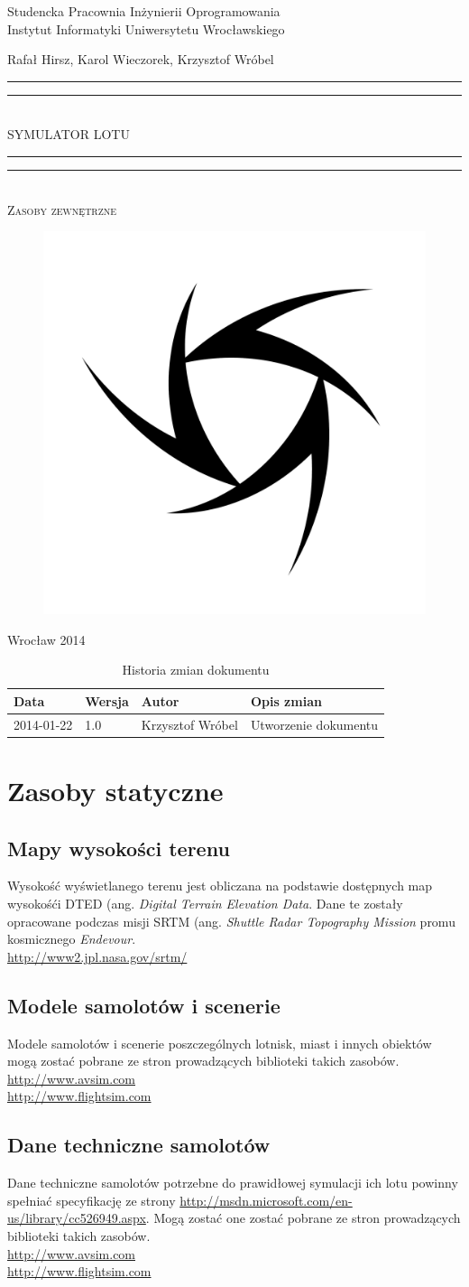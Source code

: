 \documentclass{mwrep}
\newcommand*{\titleGP}{\begingroup
\centering

{\large Studencka Pracownia Inżynierii Oprogramowania}\\Instytut Informatyki Uniwersytetu Wrocławskiego\par
\vspace*{16\baselineskip}

{\Large Rafał Hirsz, Karol Wieczorek, Krzysztof Wróbel\par}
\vspace*{\baselineskip}

\rule{\textwidth}{1.6pt}\vspace*{-\baselineskip}\vspace*{2pt}
\rule{\textwidth}{0.4pt}\\[\baselineskip]

{\Huge SYMULATOR LOTU}\\[0.2\baselineskip]

\rule{\textwidth}{0.4pt}\vspace*{-\baselineskip}\vspace{3.2pt}
\rule{\textwidth}{1.6pt}\\[\baselineskip]

\scshape
{\huge Zasoby zewnętrzne}\par
\vspace*{2\baselineskip}

\begin{figure}[h]
\centering
\includegraphics[width=5\baselineskip]{flightsim-team-logo.pdf}
\end{figure}
\vfill

{\large Wrocław 2014}\par

\pagebreak

\endgroup}
\begin{document}
\thispagestyle{empty}
\titleGP

\begin{center}
\begin{table}[h]
\begin{center}
\caption{Historia zmian dokumentu}\label{T:Zmiany}
\vspace{3ex}
\begin{tabularx}{1\textwidth}{|l|l|l|X|}
\hline
Data & Wersja & Autor & Opis zmian \\ \hline
2014-01-22 & 1.0 & Krzysztof Wróbel & Utworzenie dokumentu \\
\hline
\end{tabularx}
\end{center}
\end{table}
\end{center}

\pagebreak

\tableofcontents

\chapter{Zasoby statyczne}

\section{Mapy wysokości terenu}
Wysokość wyświetlanego terenu jest obliczana na podstawie dostępnych map wysokośći DTED (ang. \emph{Digital Terrain Elevation Data}. Dane te zostały opracowane podczas misji SRTM (ang. \emph{Shuttle Radar Topography Mission} promu kosmicznego \emph{Endevour}.\\
\url{http://www2.jpl.nasa.gov/srtm/}

\section{Modele samolotów i scenerie}
Modele samolotów i scenerie poszczególnych lotnisk, miast i innych obiektów mogą zostać pobrane ze stron prowadzących biblioteki takich zasobów.\\
\url{http://www.avsim.com}\\
\url{http://www.flightsim.com}

\section{Dane techniczne samolotów}
Dane techniczne samolotów potrzebne do prawidłowej symulacji ich lotu powinny spełniać specyfikację ze strony \url{http://msdn.microsoft.com/en-us/library/cc526949.aspx}. Mogą zostać one zostać pobrane ze stron prowadzących biblioteki takich zasobów.\\
\url{http://www.avsim.com}\\
\url{http://www.flightsim.com}
\end{document}
